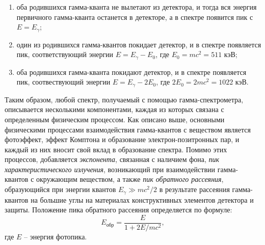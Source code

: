 	\begin{enumerate}
		\item оба родившихся гамма-кванта не вылетают из детектора, и тогда вся энергия первичного гамма-кванта останется в детекторе, а в спектре появится пик с $E=E_{\gamma}$;
		\item один из родившихся гамма-квантов покидает детектор, и в спектре появляется пик, соответствующий энергии $E=E_{\gamma}-E_0$, где $E_0=mc^2=511$ кэВ;
		\item оба родившихся гамма-кванта покидают детектор, и в спектре появляется пик, соотвествующий энергии $E=E_{\gamma}-2E_0$, где $2E_0=2mc^2=1022$ кэВ.
	\end{enumerate}
	Таким образом, любой спектр, получаемый с помощью гамма-спектрометра, описывается несколькими компонентами, каждая из которых связана с определенным физическим процессом. Как описано выше, основными физическими процессами взаимодействия гамма-квантов с веществом является фотоэффект, эффект Комптона и образование электрон-позитронных пар, и каждый из них вносит свой вклад в образование спектра. Помимо этих процессов, добавляется \textit{экспонента}, связанная с наличием фона, \textit{пик характеристического излучения}, возникающий при взаимодействии гамма-квантов с окружающим веществом, а также \textit{пик обратного рассеяния}, образующийся при энергии квантов $E_{\gamma}\gg mc^2/2$ в результате рассеяния гамма-квантов на большие углы на материалах  конструктивных элементов детектора и защиты. Положение пика обратного рассеяния определяется по формуле:
	\begin{equation}
		E_{\text{обр}}=\frac{E}{1+2E/mc^2},
		\label{eq:Ereverse}
	\end{equation}
	где $E$ -- энергия фотопика.\par
